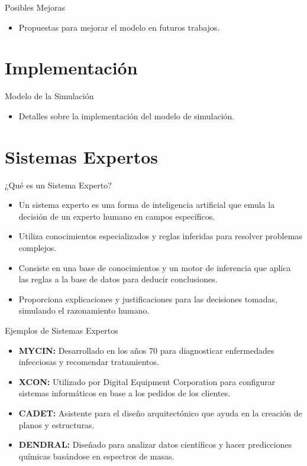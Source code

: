 \documentclass{beamer}
\begin{document}
\begin{frame}{Posibles Mejoras}
  \begin{itemize}
    \item Propuestas para mejorar el modelo en futuros trabajos.
  \end{itemize}
\end{frame}

\section{Implementación}
\begin{frame}{Modelo de la Simulación}
  \begin{itemize}
    \item Detalles sobre la implementación del modelo de simulación.
  \end{itemize}
\end{frame}

\section{Sistemas Expertos}
\begin{frame}{¿Qué es un Sistema Experto?}
  \begin{itemize}
    \item Un sistema experto es una forma de inteligencia artificial que emula la decisión de un experto humano en campos específicos.
    \item Utiliza conocimientos especializados y reglas inferidas para resolver problemas complejos.
    \item Consiste en una base de conocimientos y un motor de inferencia que aplica las reglas a la base de datos para deducir conclusiones.
    \item Proporciona explicaciones y justificaciones para las decisiones tomadas, simulando el razonamiento humano.
  \end{itemize}
\end{frame}

\begin{frame}{Ejemplos de Sistemas Expertos}
  \begin{itemize}
    \item \textbf{MYCIN:} Desarrollado en los años 70 para diagnosticar enfermedades infecciosas y recomendar tratamientos.
    \item \textbf{XCON:} Utilizado por Digital Equipment Corporation para configurar sistemas informáticos en base a los pedidos de los clientes.
    \item \textbf{CADET:} Asistente para el diseño arquitectónico que ayuda en la creación de planos y estructuras.
    \item \textbf{DENDRAL:} Diseñado para analizar datos científicos y hacer predicciones químicas basándose en espectros de masas.
  \end{itemize}
\end{frame}
\end{document}
